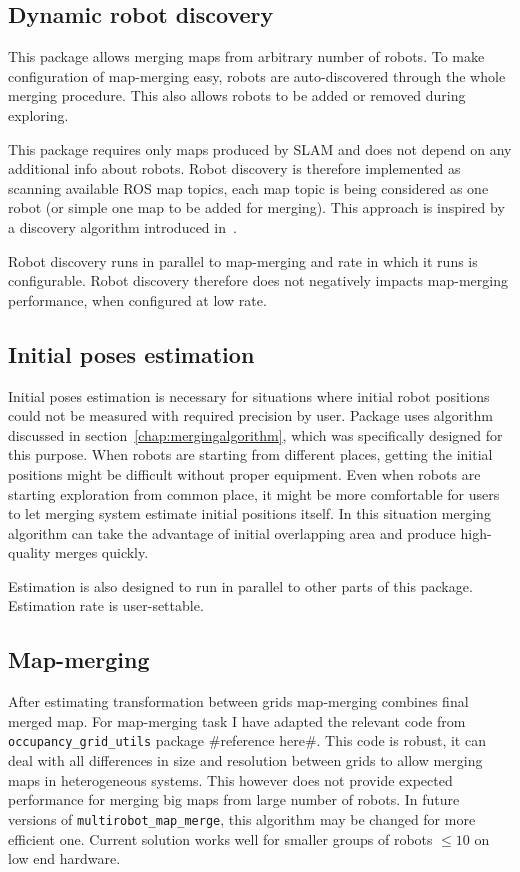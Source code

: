 \subsection{Dynamic robot discovery}

This package allows merging maps from arbitrary number of robots. To make configuration of map-merging easy, robots are auto-discovered through the whole merging procedure. This also allows robots to be added or removed during exploring.

This package requires only maps produced by \gls{SLAM} and does not depend on any additional info about robots. Robot discovery is therefore implemented as scanning available \gls{ROS} map topics, each map topic is being considered as one robot (or simple one map to be added for merging). This approach is inspired by a discovery algorithm introduced in~\cite{Yan2014}.

Robot discovery runs in parallel to map-merging and rate in which it runs is configurable. Robot discovery therefore does not negatively impacts map-merging performance, when configured at low rate.

\subsection{Initial poses estimation}

Initial poses estimation is necessary for situations where initial robot positions could not be measured with required precision by user. Package uses algorithm discussed in section~\ref{chap:mergingalgorithm}, which was specifically designed for this purpose. When robots are starting from different places, getting the initial positions might be difficult without proper equipment. Even when robots are starting exploration from common place, it might be more comfortable for users to let merging system estimate initial positions itself. In this situation merging algorithm can take the advantage of initial overlapping area and produce high-quality merges quickly.

Estimation is also designed to run in parallel to other parts of this package. Estimation rate is user-settable.

\subsection{Map-merging}

After estimating transformation between grids map-merging combines final merged map. For map-merging task I have adapted the relevant code from \texttt{occu\-pan\-cy\_grid\_uti\-ls} package \#reference here\#. This code is robust, it can deal with all differences in size and resolution between grids to allow merging maps in heterogeneous systems. This however does not provide expected performance for merging big maps from large number of robots. In future versions of \texttt{multi\-rob\-ot\_map\_merge}, this algorithm may be changed for more efficient one.
Current solution works well for smaller groups of robots $\le 10$ on low end hardware.

